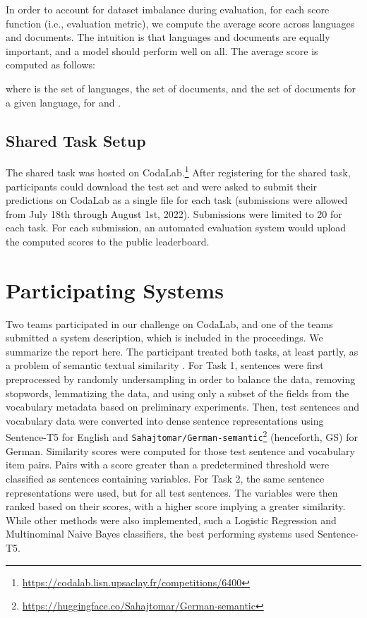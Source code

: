 \documentclass[11pt]{article}
\begin{document}
In order to account for dataset imbalance during evaluation, for each score function  (i.e., evaluation metric), we compute the average score across languages and documents.
The intuition is that languages and documents are equally important, and a model should perform well on all.
The average score is computed as follows:

\noindent where  is the set of languages,  the set of documents, and  the set of documents for a given language, for  and .

\subsection{Shared Task Setup}
The shared task was hosted on CodaLab.\footnote{\url{https://codalab.lisn.upsaclay.fr/competitions/6400}}
After registering for the shared task, participants could download the test set and were asked to submit their predictions on CodaLab as a single file for each task (submissions were allowed from July 18th through August 1st, 2022).
Submissions were limited to 20 for each task.
For each submission, an automated evaluation system would upload the computed scores to the public leaderboard.


\section{Participating Systems}
\label{sec:participating-systems}
Two teams participated in our challenge on CodaLab, and one of the teams submitted a system description, which is included in the proceedings.
We summarize the report here.
The participant \citep{hoevelmeyer2022} treated both tasks, at least partly, as a problem of semantic textual similarity \citep{agirre-etal-2013-sem}.
For Task 1, sentences were first preprocessed by randomly undersampling in order to balance the data, removing stopwords, lemmatizing the data, and using only a subset of the fields from the vocabulary metadata based on preliminary experiments.
Then, test sentences and vocabulary data were converted into dense sentence representations using Sentence-T5 \citep{ni-etal-2022-sentence} for English and \texttt{Sahajtomar/German-semantic}\footnote{\url{https://huggingface.co/Sahajtomar/German-semantic}} (henceforth, GS) for German.
Similarity scores were computed for those test sentence and vocabulary item pairs.
Pairs with a score greater than a predetermined threshold were classified as sentences containing variables.
For Task 2, the same sentence representations were used, but for all test sentences.
The variables were then ranked based on their scores, with a higher score implying a greater similarity.
While other methods were also implemented, such a Logistic Regression and Multinominal Naive Bayes classifiers, the best performing systems used Sentence-T5.
\end{document}
